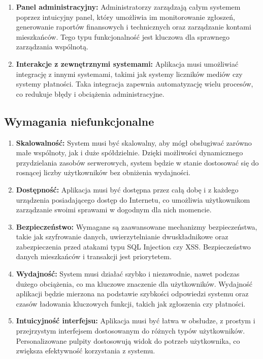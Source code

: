 \begin{enumerate}[label=\arabic*.]
	\item \textbf{Panel administracyjny:} Administratorzy zarządzają całym systemem poprzez intuicyjny panel, który umożliwia im monitorowanie zgłoszeń, generowanie raportów finansowych i technicznych oraz zarządzanie kontami mieszkańców. Tego typu funkcjonalność jest kluczowa dla sprawnego zarządzania wspólnotą.

	\item \textbf{Interakcje z zewnętrznymi systemami:} Aplikacja musi umożliwiać integrację z innymi systemami, takimi jak systemy liczników mediów czy systemy płatności. Taka integracja zapewnia automatyzację wielu procesów, co redukuje błędy i obciążenia administracyjne.

\end{enumerate}

\subsection{Wymagania niefunkcjonalne}

\begin{enumerate}[label=\arabic*.] 

	\item \textbf{Skalowalność:} System musi być skalowalny, aby mógł obsługiwać zarówno małe wspólnoty, jak i duże spółdzielnie. Dzięki możliwości dynamicznego przydzielania zasobów serwerowych, system będzie w stanie dostosować się do rosnącej liczby użytkowników bez obniżenia wydajności.
	
	\item \textbf{Dostępność:} Aplikacja musi być dostępna przez całą dobę i z każdego urządzenia posiadającego dostęp do Internetu, co umożliwia użytkownikom zarządzanie swoimi sprawami w dogodnym dla nich momencie.

	\item \textbf{Bezpieczeństwo:} Wymagane są zaawansowane mechanizmy bezpieczeństwa, takie jak szyfrowanie danych, uwierzytelnianie dwuskładnikowe oraz zabezpieczenia przed atakami typu SQL Injection czy XSS. Bezpieczeństwo danych mieszkańców i transakcji jest priorytetem.

	\item \textbf{Wydajność:} System musi działać szybko i niezawodnie, nawet podczas dużego obciążenia, co ma kluczowe znaczenie dla użytkowników. Wydajność aplikacji będzie mierzona na podstawie szybkości odpowiedzi systemu oraz czasów ładowania kluczowych funkcji, takich jak zgłoszenia czy płatności.

	\item \textbf{Intuicyjność interfejsu:} Aplikacja musi być łatwa w obsłudze, z prostym i przejrzystym interfejsem dostosowanym do różnych typów użytkowników. Personalizowane pulpity dostosowują widok do potrzeb użytkownika, co zwiększa efektywność korzystania z systemu.
	
\end{enumerate}
